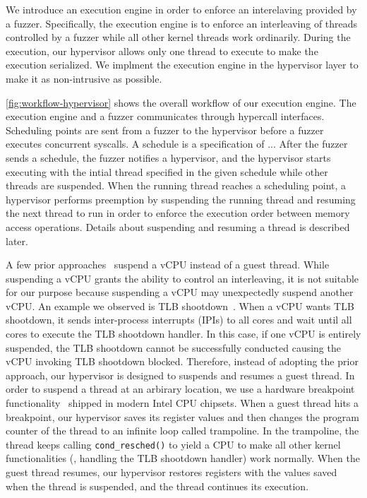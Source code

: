 We introduce an execution engine in order to enforce an interelaving
provided by a fuzzer.
%
Specifically, the execution engine is to enforce an interleaving of
threads controlled by a fuzzer while all other kernel threads work
ordinarily.
%
During the execution, our hypervisor allows only one thread to execute
to make the execution serialized.
%
We implment the execution engine in the hypervisor layer to make it as
non-intrusive as possible.

%
\autoref{fig:workflow-hypervisor} shows the overall workflow of our
execution engine.
%
The execution engine and a fuzzer communicates through hypercall
interfaces.
%
Scheduling points are sent from a fuzzer to the hypervisor before a
fuzzer executes concurrent syscalls.
%
A schedule is a specification of ...
%
After the fuzzer sends a schedule, the fuzzer notifies a hypervisor,
and the hypervisor starts executing with the intial thread specified
in the given schedule while other threads are suspended.
%
When the running thread reaches a scheduling point, a hypervisor
performs preemption by suspending the running thread and resuming the
next thread to run in order to enforce the execution order between
memory access operations.
%
Details about suspending and resuming a thread is described later.
%


%
A few prior approaches~\cite{ski, snowboard, razzer} suspend a vCPU
instead of a guest thread. While suspending a vCPU grants the ability
to control an interleaving, it is not suitable for our purpose because
suspending a vCPU may unexpectedly suspend another vCPU. An example we
observed is TLB shootdown~\cite{tlbshootdown}. When a vCPU wants TLB
shootdown, it sends inter-process interrupts (IPIs) to all cores and
wait until all cores to execute the TLB shootdown handler.  In this
case, if one vCPU is entirely suspended, the TLB shootdown cannot be
successfully conducted causing the vCPU invoking TLB shootdown
blocked.
%
Therefore, instead of adopting the prior approach, our hypervisor is
designed to suspends and resumes a guest thread.
%
In order to suspend a thread at an arbirary location, we use a
hardware breakpoint functionality~\cite{hwbp} shipped in modern Intel
CPU chipsets.
%
When a guest thread hits a breakpoint, our hypervisor saves its
register values and then changes the program counter of the thread to
an infinite loop called trampoline. In the trampoline, the thread
keeps calling \texttt{cond_resched()} to yield a CPU to make all other
kernel functionalities (\eg, handling the TLB shootdown handler) work
normally. When the guest thread resumes, our hypervisor restores
registers with the values saved when the thread is suspended, and the
thread continues its execution.


